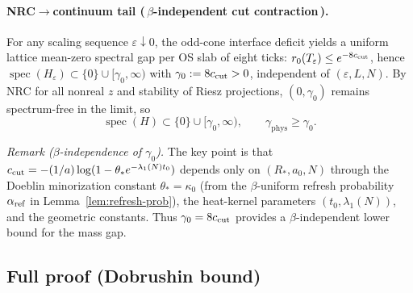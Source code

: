 \documentclass[11pt]{amsart}
\begin{document}
\paragraph{NRC$\to$continuum tail (\,$\beta$-independent cut contraction\,).}
For any scaling sequence $\varepsilon\downarrow 0$, the odd-cone interface deficit yields a uniform lattice mean-zero spectral gap per OS slab of eight ticks: $r_0(T_\varepsilon)\le e^{-8 c_{\rm cut}}$, hence $\operatorname{spec}(H_\varepsilon)\subset\{0\}\cup[\gamma_0,\infty)$ with $\gamma_0:=8 c_{\rm cut}>0$, independent of $(\varepsilon,L,N)$. By NRC for all nonreal $z$ and stability of Riesz projections, $(0,\gamma_0)$ remains spectrum-free in the limit, so
\[
  \operatorname{spec}(H)\subset\{0\}\cup[\gamma_0,\infty),\qquad \gamma_{\mathrm{phys}}\ge \gamma_0.
\]

\noindent\emph{Remark ($\beta$-independence of $\gamma_0$).} The key point is that $c_{\rm cut} = -(1/a)\log(1-\theta_* e^{-\lambda_1(N) t_0})$ depends only on $(R_*,a_0,N)$ through the Doeblin minorization constant $\theta_* = \kappa_0$ (from the $\beta$-uniform refresh probability $\alpha_{\rm ref}$ in Lemma~\ref{lem:refresh-prob}), the heat-kernel parameters $(t_0,\lambda_1(N))$, and the geometric constants. Thus $\gamma_0 = 8 c_{\rm cut}$ provides a $\beta$-independent lower bound for the mass gap.

\subsection*{Full proof (Dobrushin bound)}
\end{document}

